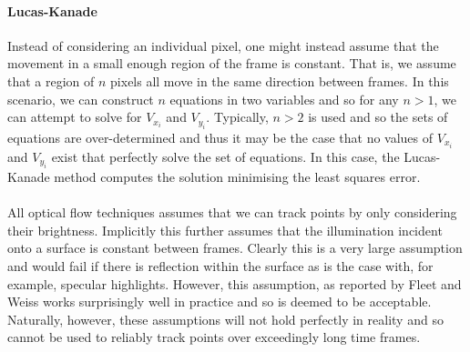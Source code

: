 \paragraph{Lucas-Kanade}
Instead of considering an individual pixel, one might instead assume that the movement in a small enough region of the frame is constant. That is, we assume that a region of $n$ pixels all move in the same direction between frames.
In this scenario, we can construct $n$ equations in two variables and so for any $n>1$, we can attempt to solve for $V_{x_i}$ and $V_{y_i}$. Typically, $n>2$ is used and so the sets of equations are over-determined and thus it may
be the case that no values of $V_{x_i}$ and $V_{y_i}$ exist that perfectly solve the set of equations. In this case, the Lucas-Kanade method computes the solution minimising the least squares error.
\\\\
All optical flow techniques assumes that we can track points by only considering their brightness. Implicitly this further assumes that the illumination incident onto a surface 
is constant between frames. Clearly this is a very large assumption and would fail if there is reflection within the surface as is the case with, for example, specular highlights. However, this assumption, as reported by 
Fleet and Weiss \cite{Fleet2006} works surprisingly well in practice and so is deemed to be acceptable. Naturally, however, these assumptions will not hold perfectly in reality and so cannot be used to reliably track points over exceedingly long time frames.

